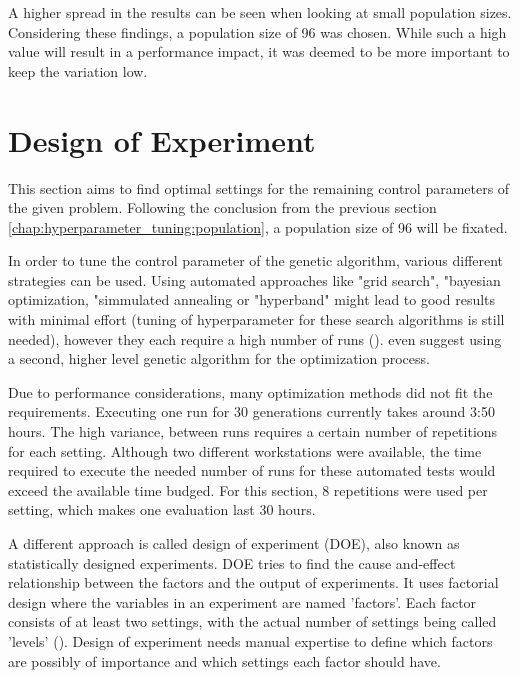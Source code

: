 A higher spread in the results can be seen when looking at small population sizes. Considering these findings, a population size of 96 was chosen. While such a high value will result in a performance impact, it was deemed to be more important to keep the variation low. 

\section{Design of Experiment}
\label{chap:hyperparameter_tuning:other_parameter}
This section aims to find optimal settings for the remaining control parameters of the given problem.
Following the conclusion from the previous section \ref{chap:hyperparameter_tuning:population}, a population size of 96 will be fixated. 

In order to tune the control parameter of the genetic algorithm, various different strategies can be used. Using automated approaches like "grid search", "bayesian optimization, "simmulated annealing or "hyperband" might lead to good results with minimal effort (tuning of hyperparameter for these search algorithms is still needed), however they each require a high number of runs (\cite{kacprzyk_parameter_2007}). \cite{kacprzyk_parameter_2007} even suggest using a second, higher level genetic algorithm for the optimization process.

Due to performance considerations, many optimization methods did not fit the requirements.
Executing one run for 30 generations currently takes around 3:50 hours. The high variance, between runs requires a certain number of repetitions for each setting. Although two different workstations were available, the time required to execute the needed number of runs for these automated tests would exceed the available time budged. For this section, 8 repetitions were used per setting, which makes one evaluation last 30 hours.

A different approach is called design of experiment (DOE), also known as statistically designed experiments. DOE tries to find the cause and-effect relationship between the factors and the output of experiments.
It uses factorial design where the variables in an experiment are named 'factors'. Each factor consists of at least two settings, with the actual number of settings being called 'levels' (\cite{yang_design_2009}). Design of experiment needs manual expertise to define which factors are possibly of importance and which settings each factor should have.

